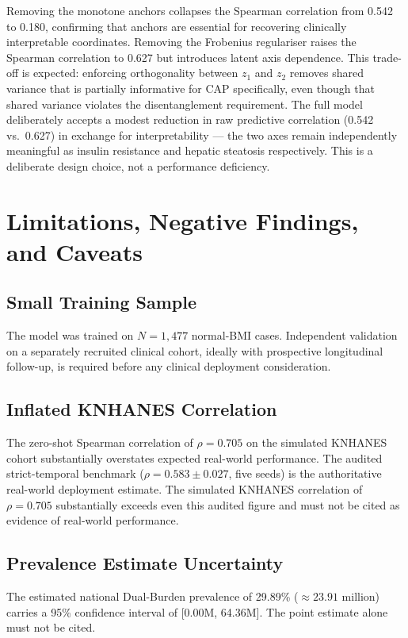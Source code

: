 \documentclass[12pt,a4paper,oneside]{report}
\begin{document}
Removing the monotone anchors collapses the Spearman correlation from 0.542 to 0.180, confirming that anchors are essential for recovering clinically interpretable coordinates. Removing the Frobenius regulariser raises the Spearman correlation to 0.627 but introduces latent axis dependence. This trade-off is expected: enforcing orthogonality between $z_1$ and $z_2$ removes shared variance that is partially informative for CAP specifically, even though that shared variance violates the disentanglement requirement. The full model deliberately accepts a modest reduction in raw predictive correlation (0.542 vs.~0.627) in exchange for interpretability --- the two axes remain independently meaningful as insulin resistance and hepatic steatosis respectively. This is a deliberate design choice, not a performance deficiency.

\section{Limitations, Negative Findings, and Caveats}

\subsection{Small Training Sample}

The model was trained on $N = 1{,}477$ normal-BMI cases. Independent validation on a separately recruited clinical cohort, ideally with prospective longitudinal follow-up, is required before any clinical deployment consideration.

\subsection{Inflated KNHANES Correlation}

The zero-shot Spearman correlation of $\rho = 0.705$ on the simulated KNHANES cohort substantially overstates expected real-world performance. The audited strict-temporal benchmark ($\rho = 0.583 \pm 0.027$, five seeds) is the authoritative real-world deployment estimate. The simulated KNHANES correlation of $\rho = 0.705$ substantially exceeds even this audited figure and must not be cited as evidence of real-world performance.

\subsection{Prevalence Estimate Uncertainty}

The estimated national Dual-Burden prevalence of 29.89\% ($\approx 23.91$ million) carries a 95\% confidence interval of [0.00M, 64.36M]. The point estimate alone must not be cited.
\end{document}
